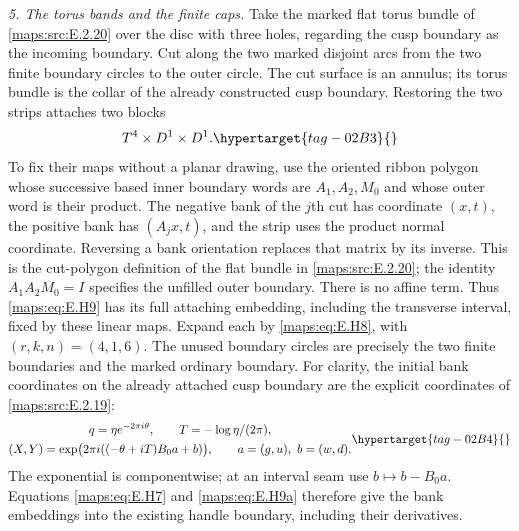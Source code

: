 \begin{theorem}
\emph{5. The torus bands and the finite caps.}
Take the marked flat torus bundle of \ref{maps:src:E.2.20} over the disc with
three holes, regarding the cusp boundary as the incoming boundary.
Cut along the two marked disjoint arcs from the two finite boundary
circles to the outer circle.  The cut surface is an annulus;
its torus bundle is the collar of the already constructed cusp
boundary.  Restoring the two strips attaches two blocks
\begin{equation}
                 T^4\times D^1\times D^1.
 \hypertarget{tag-02B3}{}\label{maps:eq:E.H9}
\end{equation}
To fix their maps without a planar drawing, use the oriented ribbon
polygon whose successive based inner boundary words are
$A_1,A_2,M_0$ and whose outer word is their product.  The negative
bank of the $j$th cut has coordinate $(x,t)$, the positive bank
has $(A_jx,t)$, and the strip uses the product normal coordinate.
Reversing a bank orientation replaces that matrix by its inverse.
This is the cut-polygon definition of the flat bundle in \ref{maps:src:E.2.20};
the identity $A_1A_2M_0=I$ specifies the unfilled outer boundary.
There is no affine term.  Thus \eqref{maps:eq:E.H9} has its full attaching
embedding, including the transverse interval, fixed by these
linear maps.  Expand each by \eqref{maps:eq:E.H8}, with $(r,k,n)=(4,1,6)$.
The unused boundary circles are precisely the two finite boundaries
and the marked ordinary boundary.
For clarity, the initial bank coordinates on the already attached
cusp boundary are the explicit coordinates of \cref{maps:src:E.2.19}:
\begin{equation}
 \begin{gathered}
 q=\eta e^{-2\pi i\theta},\qquad T=-\log\eta/(2\pi),\\
 (X,Y)=\exp\bigl(2\pi i((-\theta+iT)B_0a+b)\bigr),
 \qquad a=(g,u),\ b=(w,d).
 \end{gathered}
 \hypertarget{tag-02B4}{}\label{maps:eq:E.H9a}
\end{equation}
The exponential is componentwise; at an interval seam use
$b\mapsto b-B_0a$.  Equations \eqref{maps:eq:E.H7} and \eqref{maps:eq:E.H9a} therefore
give the bank embeddings into the existing handle
boundary, including their derivatives.  


\end{theorem}
